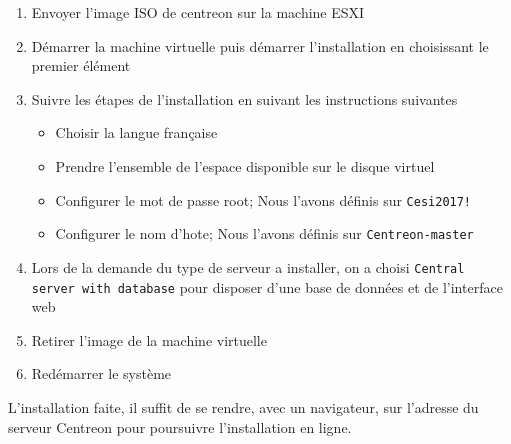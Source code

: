 	\begin{enumerate}
		\item Envoyer l'image ISO de centreon sur la machine ESXI
		\item Démarrer la machine virtuelle puis démarrer l'installation en choisissant le premier élément
		\item Suivre les étapes de l'installation en suivant les instructions suivantes
			\begin{itemize}
				\item Choisir la langue française
				\item Prendre l'ensemble de l'espace disponible sur le disque virtuel
				\item Configurer le mot de passe root; Nous l'avons définis sur \texttt{Cesi2017!}
				\item Configurer le nom d'hote; Nous l'avons définis sur \texttt{Centreon-master}
			\end{itemize}
		\item Lors de la demande du type de serveur a installer, on a choisi \texttt{Central server with database} pour disposer d'une base de données et de l'interface web
		\item Retirer l'image de la machine virtuelle
		\item Redémarrer le système
	\end{enumerate}

	L'installation faite, il suffit de se rendre, avec un navigateur, sur l'adresse du serveur Centreon pour poursuivre l'installation en ligne.

